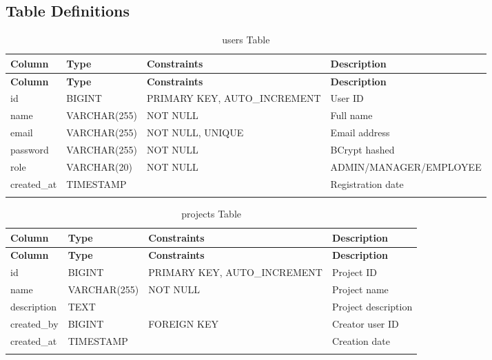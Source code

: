 \documentclass[12pt,a4paper,twoside]{book}
\begin{document}
\subsection{Table Definitions}

\begin{longtable}{|l|l|l|l|}
\hline
\textbf{Column} & \textbf{Type} & \textbf{Constraints} & \textbf{Description} \\ \hline
\endfirsthead
\hline
\textbf{Column} & \textbf{Type} & \textbf{Constraints} & \textbf{Description} \\ \hline
\endhead
id & BIGINT & PRIMARY KEY, AUTO\_INCREMENT & User ID \\ \hline
name & VARCHAR(255) & NOT NULL & Full name \\ \hline
email & VARCHAR(255) & NOT NULL, UNIQUE & Email address \\ \hline
password & VARCHAR(255) & NOT NULL & BCrypt hashed \\ \hline
role & VARCHAR(20) & NOT NULL & ADMIN/MANAGER/EMPLOYEE \\ \hline
created\_at & TIMESTAMP & & Registration date \\ \hline
\caption{users Table}
\end{longtable}

\begin{longtable}{|l|l|l|l|}
\hline
\textbf{Column} & \textbf{Type} & \textbf{Constraints} & \textbf{Description} \\ \hline
\endfirsthead
\hline
\textbf{Column} & \textbf{Type} & \textbf{Constraints} & \textbf{Description} \\ \hline
\endhead
id & BIGINT & PRIMARY KEY, AUTO\_INCREMENT & Project ID \\ \hline
name & VARCHAR(255) & NOT NULL & Project name \\ \hline
description & TEXT & & Project description \\ \hline
created\_by & BIGINT & FOREIGN KEY & Creator user ID \\ \hline
created\_at & TIMESTAMP & & Creation date \\ \hline
\caption{projects Table}
\end{longtable}
\end{document}
